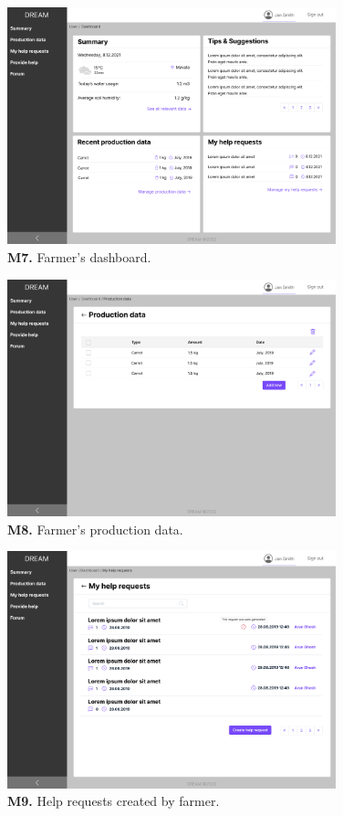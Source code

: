 \begin{figure}[H]
    \centering
    \includegraphics[width=0.85\textwidth]{mockups/Farmer_Dashboard.png}
    \caption{\textbf{M7.} Farmer's dashboard.}
\end{figure}

\begin{figure}[H]
    \centering
    \includegraphics[width=0.85\textwidth]{mockups/Farmer_Dashboard_Production data.png}
    \caption{\textbf{M8.} Farmer's production data.}
\end{figure}

\begin{figure}[H]
    \centering
    \includegraphics[width=0.85\textwidth]{mockups/Farmer_Dashboard_My help requests.png}
    \caption{\textbf{M9.} Help requests created by farmer.}
\end{figure}


